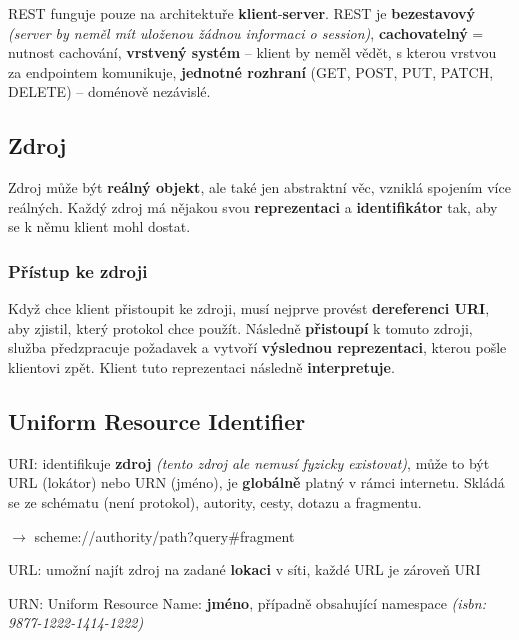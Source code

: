 REST funguje pouze na architektuře \textbf{klient}-\textbf{server}. REST je \textbf{bezestavový} \textit{(server by neměl mít uloženou žádnou informaci o session)}, \textbf{cachovatelný} = nutnost cachování, \textbf{vrstvený systém} -- klient by neměl vědět, s kterou vrstvou za endpointem komunikuje, \textbf{jednotné rozhraní} (GET, POST, PUT, PATCH, DELETE) -- doménově nezávislé.

\subsection{Zdroj}

Zdroj může být \textbf{reálný objekt}, ale také jen abstraktní věc, vzniklá spojením více reálných. Každý zdroj má nějakou svou \textbf{reprezentaci} a \textbf{identifikátor} tak, aby se k němu klient mohl dostat.

\newpage
\subsubsection*{Přístup ke zdroji}

Když chce klient přistoupit ke zdroji, musí nejprve provést \textbf{dereferenci URI}, aby zjistil, který protokol chce použít. Následně \textbf{přistoupí} k tomuto zdroji, služba předzpracuje požadavek a vytvoří \textbf{výslednou reprezentaci}, kterou pošle klientovi zpět. Klient tuto reprezentaci následně \textbf{interpretuje}.

\subsection{Uniform Resource Identifier}

URI: identifikuje \textbf{zdroj} \textit{(tento zdroj ale nemusí fyzicky existovat)}, může to být URL (lokátor) nebo URN (jméno), je \textbf{globálně} platný v rámci internetu. Skládá se ze schématu (není protokol), autority, cesty, dotazu a fragmentu.

\vspace{4pt}
\noindent $\to$ scheme://authority/path?query\#fragment

\vspace{4pt}
\noindent URL: umožní najít zdroj na zadané \textbf{lokaci} v síti, každé URL je zároveň URI

\vspace{4pt}
\noindent URN: Uniform Resource Name: \textbf{jméno}, případně obsahující namespace \textit{(isbn: 9877-1222-1414-1222)}

